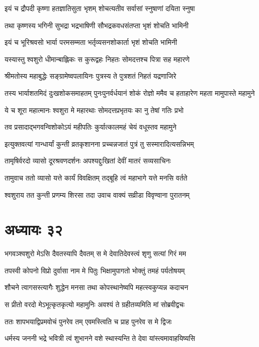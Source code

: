 \twolineshloka
{इयं च द्रौपदी कृष्णा हतज्ञातिसुता भृशम्}
{शोचत्यतीव सर्वासां स्नुषाणां दयिता स्नुषा}


\twolineshloka
{तथा कृष्णस्य भगिनी सुभद्रा भद्रभाषिणी}
{सौभद्रकवधसंतप्ता भृशं शोचति भामिनी}


\twolineshloka
{इयं च भूरिश्रवसो भार्या परमसम्मता}
{भर्तृव्यसनशोकार्ता भृशं शोचति भामिनी}


\twolineshloka
{यस्यास्तु श्वशुरो धीमान्बाह्लिकः स कुरूद्वहः}
{निहतः सोमदत्तश्च पित्रा सह महारणे}


\twolineshloka
{श्रीमतोस्य महाबुद्धेः सङ्ग्रामेष्वपलायिनः}
{पुत्रस्य ते पुत्रशतं निहतं यद्रणाजिरे}


\threelineshloka
{तस्य भार्याशतमिदं दुःखशोकसमाहतम्}
{पुनःपुनर्वर्धयानं शोकं रोज्ञो ममैव च}
{हताहारेण महता मामुपास्ते महामुने}


\twolineshloka
{ये च शूरा महात्मानः श्वशुरा मे महारथाः}
{सोमदत्तप्रभृतयः का नु तेषां गतिः प्रभो}


\twolineshloka
{तव प्रसादाद्भगवन्विशोकोऽयं महीपतिः}
{कुर्यात्कालमहं चेयं वधूस्तव महामुने}


\twolineshloka
{इत्युक्तवत्यां गान्धार्यां कुन्ती व्रतकृशानना}
{प्रच्चन्नजातं पुत्रं तु सस्मारादित्यसन्निभम्}


\twolineshloka
{तामृषिर्वरदो व्यासो दूरश्रवणदर्शनः}
{अपश्यद्दुःखितां देवीं मातरं सव्यसाचिनः}


\twolineshloka
{तामुवाच ततो व्यासो यत्ते कार्यं विवक्षितम्}
{तद्बूहि त्वं महाभागे यत्ते मनसि वर्तते}


\twolineshloka
{श्वशुराय तत कुन्ती प्रणम्य शिरसा तदा}
{उवाच वाक्यं सव्रीडा विवृण्वाना पुरातनम्}


\chapter{अध्यायः ३२}
\twolineshloka
{भगवञ्श्वशुरो मेऽसि दैवतस्यापि दैवतम्}
{स मे देवातिदेवस्त्वं शृणु सत्यां गिरं मम}


\twolineshloka
{तपस्वी कोपनो विप्रो दुर्वासा नाम मे पितुः}
{भिक्षामुपागतो भोक्तुं तमहं पर्यतोषयम्}


\twolineshloka
{शौचने त्वागसस्त्यागैः शुद्धेन मनसा तथा}
{कोपस्थानेष्वपि महत्स्वकुप्यन्न कदाचन}


\twolineshloka
{स प्रीतो वरदो मेऽभूत्कृतकृत्यो महामुनिः}
{अवश्यं ते ग्रहीतव्यमिति मां सोब्रवीद्वचः}


\twolineshloka
{ततः शापभयाद्विप्रमवोचं पुनरेव तम्}
{एवमस्त्विति च प्राह पुनरेव स मे द्विजः}


\twolineshloka
{धर्मस्य जननी भद्रे भवित्री त्वं शुभानने}
{वशे स्थास्यन्ति ते देवा यांस्त्वमावाहयिष्यसि}


